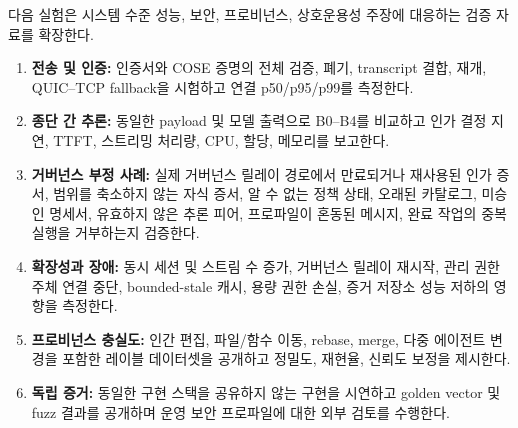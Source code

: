 \documentclass[10pt]{article}
\begin{document}
다음 실험은 시스템 수준 성능, 보안, 프로비넌스, 상호운용성 주장에 대응하는 검증 자료를 확장한다.

\begin{enumerate}[itemsep=1pt,topsep=2pt]
  \item \textbf{전송 및 인증:} 인증서와 COSE 증명의 전체 검증, 폐기, transcript 결합, 재개, QUIC--TCP fallback을 시험하고 연결 p50/p95/p99를 측정한다.
  \item \textbf{종단 간 추론:} 동일한 payload 및 모델 출력으로 B0--B4를 비교하고 인가 결정 지연, TTFT, 스트리밍 처리량, CPU, 할당, 메모리를 보고한다.
  \item \textbf{거버넌스 부정 사례:} 실제 거버넌스 릴레이 경로에서 만료되거나 재사용된 인가 증서, 범위를 축소하지 않는 자식 증서, 알 수 없는 정책 상태, 오래된 카탈로그, 미승인 명세서, 유효하지 않은 추론 피어, 프로파일이 혼동된 메시지, 완료 작업의 중복 실행을 거부하는지 검증한다.
  \item \textbf{확장성과 장애:} 동시 세션 및 스트림 수 증가, 거버넌스 릴레이 재시작, 관리 권한 주체 연결 중단, bounded-stale 캐시, 용량 권한 손실, 증거 저장소 성능 저하의 영향을 측정한다.
  \item \textbf{프로비넌스 충실도:} 인간 편집, 파일/함수 이동, rebase, merge, 다중 에이전트 변경을 포함한 레이블 데이터셋을 공개하고 정밀도, 재현율, 신뢰도 보정을 제시한다.
  \item \textbf{독립 증거:} 동일한 구현 스택을 공유하지 않는 구현을 시연하고 golden vector 및 fuzz 결과를 공개하며 운영 보안 프로파일에 대한 외부 검토를 수행한다.
\end{enumerate}
\end{document}
